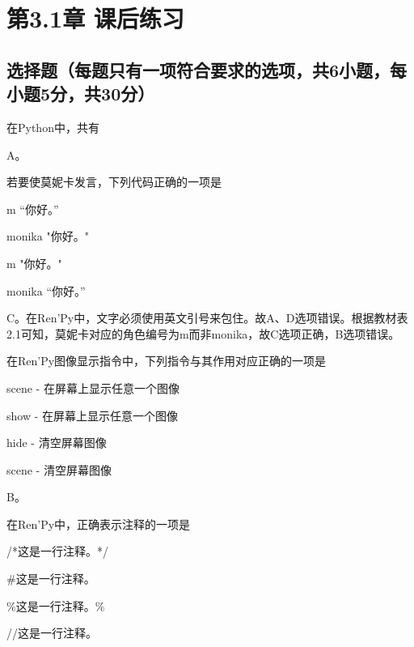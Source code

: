 \documentclass[../Exercises.tex]{subfiles}
\begin{document}
\chapter{第3.1章 课后练习}
\section{选择题（每题只有一项符合要求的选项，共6小题，每小题5分，共30分）}
\begin{question}
    在Python中，共有
\end{question}

\begin{solution}[pre-analysis=【答案】]
    A。
\end{solution}

\begin{question}
    若要使莫妮卡发言，下列代码正确的一项是 \paren
    \begin{choices}
        \item m “你好。”
        \item monika \textsf{"}你好。\textsf{"}
        \item m \textsf{"}你好。\textsf{"}
        \item monika “你好。”
    \end{choices}
\end{question}

\begin{solution}
    C。在Ren'Py中，文字必须使用英文引号来包住。故A、D选项错误。根据教材表2.1可知，莫妮卡对应的角色编号为m而非monika，故C选项正确，B选项错误。
\end{solution}

\begin{question}
    在Ren'Py图像显示指令中，下列指令与其作用对应正确的一项是\paren
    \begin{choices}
        \item scene - 在屏幕上显示任意一个图像
        \item show - 在屏幕上显示任意一个图像
        \item hide - 清空屏幕图像
        \item scene - 清空屏幕图像
    \end{choices}
\end{question}

\begin{solution}[pre-analysis=【答案】]
    B。
\end{solution}

\begin{question}
    在Ren'Py中，正确表示注释的一项是\paren
    \begin{choices}
        \item /*这是一行注释。*/
        \item \#这是一行注释。
        \item \%这是一行注释。\%
        \item //这是一行注释。
    \end{choices}
\end{question}
\end{document}
